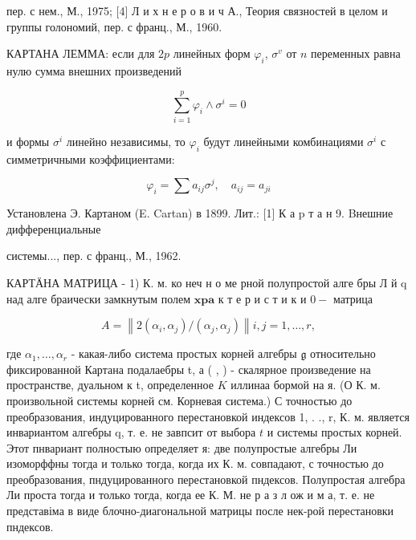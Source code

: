 \documentclass[10pt]{article}
\begin{document}
пер. с нем., М., 1975; [4] Л и х н е р о в и ч А., Теория связностей в целом и группы голономий, пер. с франц., М., 1960.



КАРТАНА ЛЕММА: если для $2 p$ линейных форм $\varphi_{i}$, $\sigma^{v}$ от $n$ переменных равна нулю сумма внешних произведений



\[

\sum_{i=1}^{p} \varphi_{i} \wedge \sigma^{i}=0

\]



и формы $\sigma^{i}$ линейно независимы, то $\varphi_{i}$ будут линейными комбинациями $\sigma^{i}$ с симметричными коэффициентами:



\[

\varphi_{i}=\sum a_{i j} \sigma^{j}, \quad a_{i j}=a_{j i}

\]



Установлена Э. Картаном (E. Cartan) в 1899. Лит.: [1] К а p т а н 9. Bнешние дифференциальные

системы..., пер. с франц., М., 1962.



КАРТӒНА МАТРИЦА - 1) К. м. ко неч н о ме рной полупростой алге бры Л й q над алге браически замкнутым полем $\mathbf{x} \mathbf{p} \mathbf{a}$ к т е р и с т и к и $0-$ матрица



\[

A=\left\|2\left(\alpha_{i}, \alpha_{j}\right) /\left(\alpha_{j}, \alpha_{j}\right)\right\| i, j=1, \ldots, r,

\]



где $\alpha_{1}, \ldots, \alpha_{r}$ - какая-либо система простых корней алгебры $\mathfrak{g}$ относительно фиксированной Картана подалаебры t, а ( , ) - скалярное произведение на пространстве, дуальном к t, определенное $K$ иллинаа бормой на я. (О К. м. произвольной системы корней см. Корневая система.) С точностью до преобразования, индуцированного перестановкой индексов 1, . ., r, К. м. является инвариантом алгебры q, т. е. не завпсит от выбора $t$ и системы простых корней. Этот пнвариант полностыю определяет я: две полупростые алгебры Ли изоморффны тогда и только тогда, когда их К. м. совпадают, с точностью до преобразования, пндуцированного перестановкой пндексов. Полупростая алгебра Ли проста тогда и только тогда, когда ее К. М. не р а з л ож и м а, т. е. не представіма в виде блочно-диагональной матрицы после нек-рой перестановки пндексов.
\end{document}
